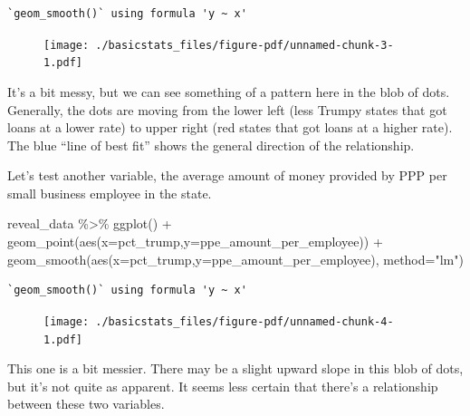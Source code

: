 \documentclass[
  letterpaper,
  DIV=11,
  numbers=noendperiod]{scrreprt}
\newenvironment{Shaded}{\begin{snugshade}}{\end{snugshade}}
\newcommand{\AttributeTok}[1]{\textcolor[rgb]{0.40,0.45,0.13}{#1}}
\newcommand{\FunctionTok}[1]{\textcolor[rgb]{0.28,0.35,0.67}{#1}}
\newcommand{\NormalTok}[1]{\textcolor[rgb]{0.00,0.23,0.31}{#1}}
\newcommand{\SpecialCharTok}[1]{\textcolor[rgb]{0.37,0.37,0.37}{#1}}
\newcommand{\StringTok}[1]{\textcolor[rgb]{0.13,0.47,0.30}{#1}}
\begin{document}
\begin{verbatim}
`geom_smooth()` using formula 'y ~ x'
\end{verbatim}

\begin{figure}[H]

{\centering \texttt{[image: ./basicstats\_files/figure-pdf/unnamed-chunk-3-1.pdf]}

}

\end{figure}

It's a bit messy, but we can see something of a pattern here in the blob
of dots. Generally, the dots are moving from the lower left (less Trumpy
states that got loans at a lower rate) to upper right (red states that
got loans at a higher rate). The blue ``line of best fit'' shows the
general direction of the relationship.

Let's test another variable, the average amount of money provided by PPP
per small business employee in the state.

\begin{Shaded}
\begin{Highlighting}[]
\NormalTok{reveal\_data }\SpecialCharTok{\%\textgreater{}\%}
  \FunctionTok{ggplot}\NormalTok{() }\SpecialCharTok{+}
  \FunctionTok{geom\_point}\NormalTok{(}\FunctionTok{aes}\NormalTok{(}\AttributeTok{x=}\NormalTok{pct\_trump,}\AttributeTok{y=}\NormalTok{ppe\_amount\_per\_employee)) }\SpecialCharTok{+}
  \FunctionTok{geom\_smooth}\NormalTok{(}\FunctionTok{aes}\NormalTok{(}\AttributeTok{x=}\NormalTok{pct\_trump,}\AttributeTok{y=}\NormalTok{ppe\_amount\_per\_employee), }\AttributeTok{method=}\StringTok{"lm"}\NormalTok{)}
\end{Highlighting}
\end{Shaded}

\begin{verbatim}
`geom_smooth()` using formula 'y ~ x'
\end{verbatim}

\begin{figure}[H]

{\centering \texttt{[image: ./basicstats\_files/figure-pdf/unnamed-chunk-4-1.pdf]}

}

\end{figure}

This one is a bit messier. There may be a slight upward slope in this
blob of dots, but it's not quite as apparent. It seems less certain that
there's a relationship between these two variables.
\end{document}
